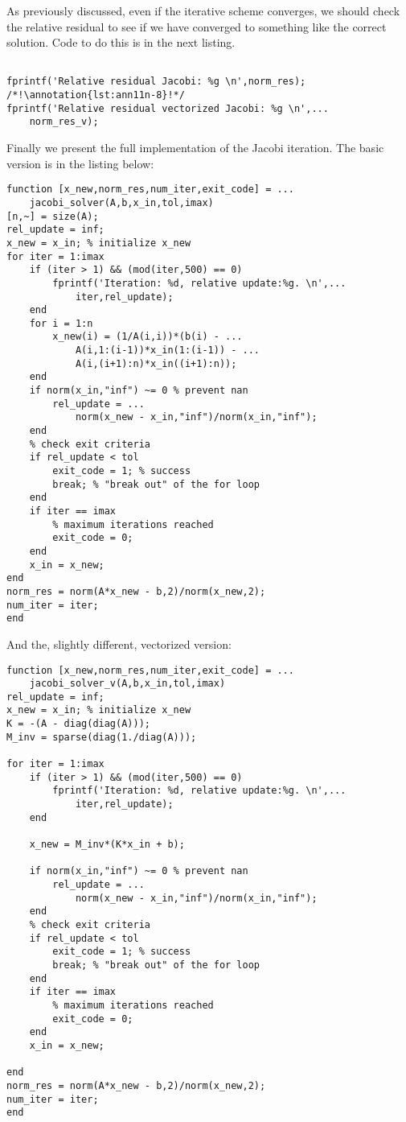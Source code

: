 As previously discussed, even if the iterative scheme converges, we should check the relative residual to see if we have converged to something like the correct solution.  Code to do this is in the next listing.
\begin{lstlisting}[style=myMatlab, name=lec11n_jacobi]
%% Check Relative Residual

fprintf('Relative residual Jacobi: %g \n',norm_res); /*!\annotation{lst:ann11n-8}!*/
fprintf('Relative residual vectorized Jacobi: %g \n',...
    norm_res_v);
\end{lstlisting}

Finally we present the full implementation of the Jacobi iteration.  The basic version is in the listing below:
\begin{lstlisting}[style=myMatlab, name=lec11n-jacobi]
%% Local functions
function [x_new,norm_res,num_iter,exit_code] = ...
    jacobi_solver(A,b,x_in,tol,imax)
[n,~] = size(A);
rel_update = inf;
x_new = x_in; % initialize x_new
for iter = 1:imax
    if (iter > 1) && (mod(iter,500) == 0)
        fprintf('Iteration: %d, relative update:%g. \n',...
            iter,rel_update);
    end 
    for i = 1:n
        x_new(i) = (1/A(i,i))*(b(i) - ...
            A(i,1:(i-1))*x_in(1:(i-1)) - ...
            A(i,(i+1):n)*x_in((i+1):n));
    end
    if norm(x_in,"inf") ~= 0 % prevent nan
        rel_update = ...
            norm(x_new - x_in,"inf")/norm(x_in,"inf");
    end    
    % check exit criteria
    if rel_update < tol
        exit_code = 1; % success
        break; % "break out" of the for loop
    end    
    if iter == imax
        % maximum iterations reached
        exit_code = 0; 
    end
    x_in = x_new;    
end
norm_res = norm(A*x_new - b,2)/norm(x_new,2);
num_iter = iter;
end
\end{lstlisting}
And the, slightly different, vectorized version:

\begin{lstlisting}[style=myMatlab, name=lec11n-jacobi]
function [x_new,norm_res,num_iter,exit_code] = ...
    jacobi_solver_v(A,b,x_in,tol,imax)
rel_update = inf;
x_new = x_in; % initialize x_new
K = -(A - diag(diag(A)));
M_inv = sparse(diag(1./diag(A)));

for iter = 1:imax
    if (iter > 1) && (mod(iter,500) == 0)
        fprintf('Iteration: %d, relative update:%g. \n',...
            iter,rel_update);
    end
    
    x_new = M_inv*(K*x_in + b);

    if norm(x_in,"inf") ~= 0 % prevent nan
        rel_update = ...
            norm(x_new - x_in,"inf")/norm(x_in,"inf");
    end    
    % check exit criteria
    if rel_update < tol
        exit_code = 1; % success
        break; % "break out" of the for loop
    end    
    if iter == imax
        % maximum iterations reached
        exit_code = 0; 
    end
    x_in = x_new;
    
end
norm_res = norm(A*x_new - b,2)/norm(x_new,2);
num_iter = iter;
end
\end{lstlisting}
